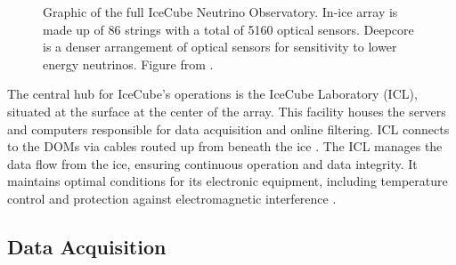 \begin{figure}
    \caption{Graphic of the full IceCube Neutrino Observatory. In-ice array is made up of 86 strings with a total of 5160 optical sensors. Deepcore is a denser arrangement of optical sensors for sensitivity to lower energy neutrinos. Figure from \cite{IceCube_SPGallery}.}
    \label{fig:IC3_full_detector}
\end{figure}

The central hub for IceCube's operations is the IceCube Laboratory (ICL), situated at the surface at the center of the array.
This facility houses the servers and computers responsible for data acquisition and online filtering.
ICL connects to the DOMs via cables routed up from beneath the ice \cite{IC3_thedetector}.
The ICL manages the data flow from the ice, ensuring continuous operation and data integrity.
It maintains optimal conditions for its electronic equipment, including temperature control and protection against electromagnetic interference \cite{IC3_thedetector}.


\subsection{Data Acquisition}

